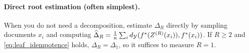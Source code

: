\paragraph{Direct root estimation (often simplest).}
When you do not need a decomposition, estimate $\Delta_R$ directly by sampling documents
$x_i$ and computing $\widehat\Delta_R=\frac1n\sum_i d_{\mathcal{Y}}(f^{\ast}(Z^{(R)}(x_i)),f^{\ast}(x_i))$.
If $R\ge2$ and \eqref{eq:leaf_idempotence} holds, $\Delta_R=\Delta_1$, so it suffices to measure $R=1$.




